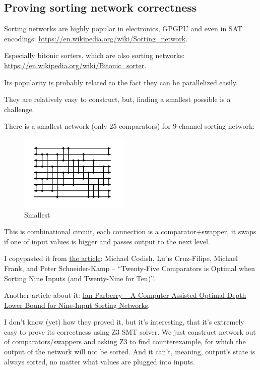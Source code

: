 \subsection{Proving sorting network correctness}

Sorting networks are highly popular in electronics, GPGPU and even in SAT encodings:
\url{https://en.wikipedia.org/wiki/Sorting_network}.

Especially bitonic sorters, which are also sorting networks:
\url{https://en.wikipedia.org/wiki/Bitonic_sorter}.

Its popularity is probably related to the fact they can be parallelized easily.

They are relatively easy to construct, but, finding a smallest possible is a challenge.

There is a smallest network (only 25 comparators) for 9-channel sorting network:

\begin{figure}[H]
\label{fig:pipe_shuffled}
\centering
\includegraphics[scale=0.75]{SMT/sorting_network/network9.png}
\caption{Smallest}
\end{figure}

This is combinational circuit, each connection is a comparator+swapper, it swaps if one of input values is bigger and passes output to the next level.

I copypasted it from \href{https://arxiv.org/pdf/1405.5754.pdf}{the article}:
Michael Codish, Lu ́ıs Cruz-Filipe, Michael Frank, and Peter Schneider-Kamp --
``Twenty-Five Comparators is Optimal when Sorting Nine Inputs (and Twenty-Nine for Ten)''.

Another article about it: \href{http://larc.unt.edu/ian/pubs/9-input.pdf}{Ian Parberry -- A Computer Assisted Optimal Depth Lower Bound for Nine-Input Sorting Networks}.

I don't know (yet) how they proved it, but it's interesting, that it's extremely easy to prove its correctness using Z3 SMT solver.
We just construct network out of comparators/swappers and asking Z3 to find counterexample, for which the output of the network will not be sorted.
And it can't, meaning, output's state is always sorted, no matter what values are plugged into inputs.

